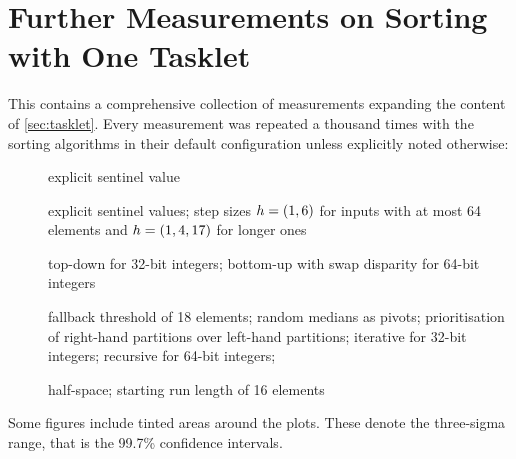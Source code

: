 \chapter{Further Measurements on Sorting with One Tasklet}
\label{apx:tasklet}

This  contains a comprehensive collection of measurements expanding the content of \cref{sec:tasklet}.
Every measurement was repeated a thousand times with the sorting algorithms in their default configuration unless explicitly noted otherwise:
\begin{description}
	\item[\IS{}]
	explicit sentinel value

	\item[\ShS{}]
	explicit sentinel values;
	step sizes \(h = (1, 6)\) for inputs with at most 64 elements and \(h = (1, 4, 17)\) for longer ones

	\item[\HS{}]
	top-down for 32-bit integers;
	bottom-up with swap disparity for 64-bit integers

	\item[\QS{}]
	fallback threshold of 18 elements;
	random medians as pivots;
	prioritisation of right-hand partitions over left-hand partitions;
	iterative for 32-bit integers;
	recursive for 64-bit integers;

	\item[\MS{}]
	half-space;
	starting run length of 16 elements
\end{description}
Some figures include tinted areas around the plots.
These denote the three-sigma range, that is the 99.7\% confidence intervals.

\clearpage


\clearpage


\clearpage


\clearpage


\clearpage

